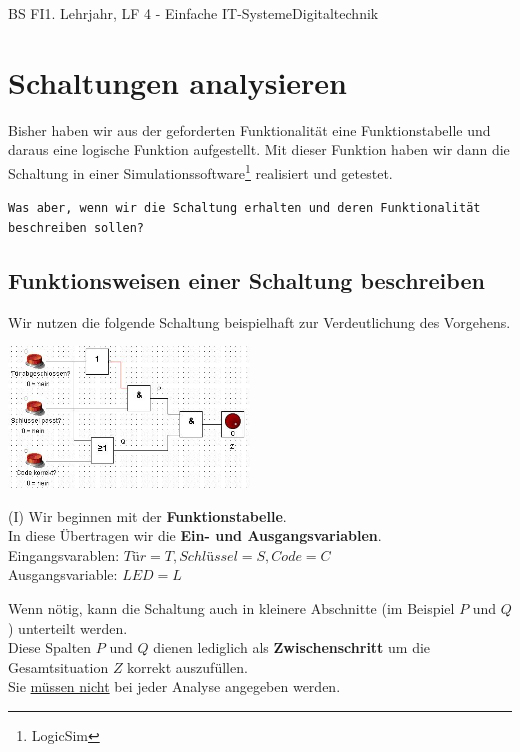 \documentclass[11pt,twocolumn,oneside,openany,headings=optiontotoc,11pt,numbers=noenddot]{article}
\begin{document}
	\begin{worksheet}{BS FI}{1. Lehrjahr, LF 4 - Einfache IT-Systeme}{Digitaltechnik}
		\setcounter{section}{6}
		\section{Schaltungen analysieren}
		Bisher haben wir aus der geforderten Funktionalität eine Funktionstabelle und daraus eine logische Funktion aufgestellt. Mit dieser Funktion haben wir dann die Schaltung in einer Simulationssoftware\footnote{LogicSim} realisiert und getestet.\\
		\par\noindent
		\texttt{Was aber, wenn wir die Schaltung erhalten und deren Funktionalität beschreiben sollen?}\\
		\subsection*{Funktionsweisen einer Schaltung beschreiben}
		Wir nutzen die folgende Schaltung beispielhaft zur Verdeutlichung des Vorgehens.\\
		\par\noindent
		\includegraphics[width=0.48\textwidth]{../99_Bilder/schAna.jpg}\\
		\par\noindent
		(I) Wir beginnen mit der \textbf{Funktionstabelle}.\\
		In diese Übertragen wir die \textbf{Ein- und Ausgangsvariablen}.\\
		Eingangsvarablen: \(Tür = T, Schlüssel = S, Code = C\)\\
		Ausgangsvariable: \(LED = L\)
		\begin{framed}
			\noindent
			\footnotesize{Wenn nötig, kann die Schaltung auch in kleinere Abschnitte (im Beispiel \(P\) und \(Q\)) unterteilt werden.\\
			Diese Spalten \(P\) und \(Q\) dienen lediglich als \textbf{Zwischenschritt} um die Gesamtsituation \(Z\) korrekt auszufüllen.\\
			Sie \underline{müssen nicht} bei jeder Analyse angegeben werden.}

\end{framed}
\end{worksheet}
\end{document}
